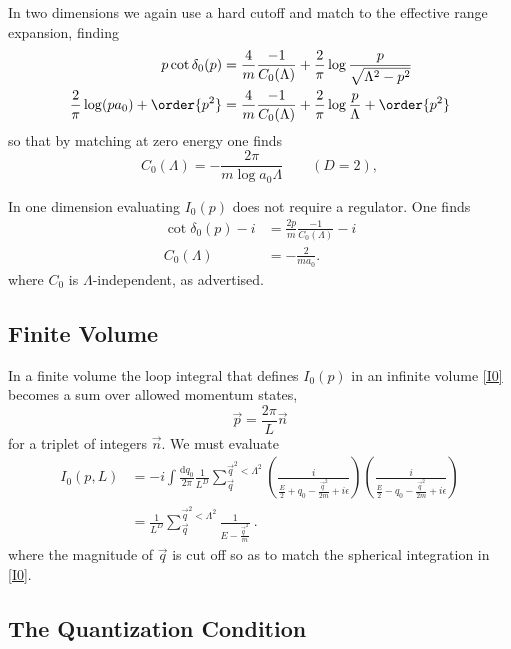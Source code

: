 In two dimensions we again use a hard cutoff and match to the effective range expansion, finding
\begin{align}
    p \cot \delta_0(p)
    &=
    \frac{4}{m}\frac{-1}{C_0(\Lambda)} + \frac{2}{\pi} \log \frac{p}{\sqrt{\Lambda^2-p^2}}
    \\
    \frac{2}{\pi} \log(p a_0) +\order{p^2}
    &=
    \frac{4}{m}\frac{-1}{C_0(\Lambda)} + \frac{2}{\pi} \log \frac{p}{\Lambda} + \order{p^2}
\end{align}
so that by matching at zero energy one finds
\begin{equation}
    C_0(\Lambda) = - \frac{2\pi}{m \log a_0 \Lambda} \quad\quad (D=2),
\end{equation}

In one dimension evaluating $I_0(p)$ does not require a regulator.
One finds
\begin{align}
    \cot \delta_0(p) - i &= \frac{2p}{m}\frac{-1}{C_0(\Lambda)} - i
    \\
    C_0(\Lambda) &= - \frac{2}{m a_0}.
\end{align}
where $C_0$ is $\Lambda$-independent, as advertised.


\subsection{Finite Volume}

In a finite volume the loop integral that defines $I_0(p)$ in an infinite volume \eqref{I0} becomes a sum over allowed momentum states,
\begin{equation}
    \vec{p} = \frac{2\pi}{L} \vec{n}
\end{equation}
for a triplet of integers $\vec{n}$.  We must evaluate
\begin{align}
I_0(p,L)
    &=-i\int \frac { \mathrm {d}q_0}{2\pi} \frac{1}{L^D}\sum_{\vec{q}}^{\vec{q}^2 < \Lambda^2} \left( \frac { i } { \frac{E}{2} + q _ { 0 } - \frac{\vec{q}^2}{2m} + i \epsilon } \right) \left( \frac { i } { \frac{E}{2} - q _ { 0 } - \frac{\vec{q}^2}{2m} + i \epsilon } \right)
    \\
    &=\frac{1}{L^D}\sum_{\vec{q}}^{\vec{q}^2 < \Lambda^2} \frac { 1 } { E - \frac{\vec{q}^2}{m} } \ .
\end{align}
where the magnitude of $\vec{q}$ is cut off so as to match the spherical integration in \eqref{I0}.



\subsection{The Quantization Condition}
